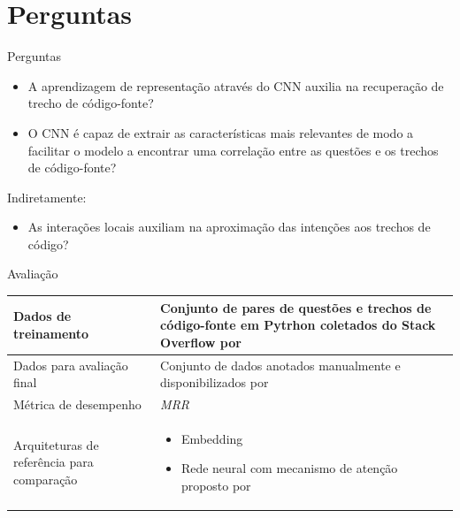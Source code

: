 \documentclass[10pt]{beamer}
\begin{document}
\section{Perguntas}


\begin{frame}{Perguntas}
	\begin{itemize}
	    \item A aprendizagem de representação através do CNN auxilia na recuperação de trecho de código-fonte?
	    \item O CNN é capaz de extrair as características mais relevantes de modo a facilitar o modelo a encontrar uma correlação entre as questões e os trechos de código-fonte?
	\end{itemize}
	Indiretamente:
	\begin{itemize}
	    \item As interações locais auxiliam na aproximação das intenções aos trechos de código?
	\end{itemize}
\end{frame}

\begin{frame}{Avaliação}
   \begin{center}
       \begin{tabular}{|p{4cm}|p{4cm}|}
            \hline
            Dados de treinamento & Conjunto de pares de questões e trechos de código-fonte em Pytrhon coletados do Stack Overflow por \cite{yao-2018} \\ 
            \hline
            Dados para avaliação final & Conjunto de dados anotados manualmente e disponibilizados por \cite{yao-2018} \\
            \hline
            Métrica de desempenho & \emph{MRR} \\
            \hline
            Arquiteturas de referência para comparação & \begin{itemize}
                \item Embedding
                \item Rede neural com mecanismo de atenção proposto por \cite{cambronero-deep-learning-code-search:2019}
            \end{itemize} \\
            \hline
       \end{tabular}
   \end{center}
\end{frame}
\end{document}
